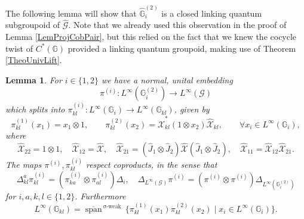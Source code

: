 \documentclass[reqno]{amsart}
\numberwithin{equation}{section}
\newtheorem{Lem}[Theorem]{Lemma}
\newcommand{\G}{\mathbb{G}}
\newcommand{\msG}{\mathscr{G}}
\newcommand{\mcX}{\mathcal{X}}
\newcommand{\wh}{\widehat}
\begin{document}
The following lemma will show that $\hat{\G}_{i}^{(2)}$ is a closed linking quantum subgroupoid of $\hat{\msG}$. Note that we already used this observation in the proof of Lemma \ref{LemProjCobPair}, but this relied on the fact that we knew the cocycle twist of $C^*(\G)$  provided a linking quantum groupoid, making use of Theorem \ref{TheoUnivLift}. 



\begin{Lem}\label{LemmaInclusionSubgroups}
For $i\in\{1,2\}$ we have a normal, unital embedding
\[
\pi^{(i)}\colon L^{\infty}(\G_i^{(2)}) \rightarrow L^{\infty}(\msG)
\]
which splits into $\pi^{(i)}_{kl}\colon L^{\infty}(\G_i) \rightarrow L^{\infty}(\G_{kl})$, given by 
\begin{equation}\label{EqInclusions}
\pi^{(1)}_{kl}(x_1) = x_1\otimes 1,\qquad \pi^{(2)}_{kl}(x_2) = \wh{\mcX}_{kl}^*(1\otimes x_2)\wh{\mcX}_{kl},\qquad \forall x_i \in L^{\infty}(\G_i),
\end{equation}
where 
\[
\wh{\mcX}_{22} = 1\otimes 1,\quad \wh{\mcX}_{12} = \wh{\mcX},\quad \wh{\mcX}_{21} = (\hat{J}_1\otimes \hat{J}_2)\wh{\mcX}(\hat{J}_1\otimes \hat{J}_2),\quad \wh{\mcX}_{11}= \wh{\mcX}_{12}\wh{\mcX}_{21}. 
\]
The maps $\pi^{(i)},\pi^{(i)}_{kl}$ respect coproducts, in the sense that
\[
\Delta^a_{kl}\pi^{(i)}_{kl}=
(\pi^{(i)}_{ka}\otimes \pi^{(i)}_{al})\Delta_i,\quad 
\Delta_{L^{\infty}(\msG)}\pi^{(i)}=
(\pi^{(i)}\otimes \pi^{(i)})\Delta_{L^{\infty}(\G_i^{(2)})}
\]
for $i,a,k,l\in\{1,2\}$. Furthermore
\[
L^{\infty}(\G_{kl}) = \overline{\operatorname{span}}^{\,\sigma\textrm{-weak}}\,\{\pi^{(1)}_{kl}(x_1)\pi^{(2)}_{kl}(x_2) \mid x_i \in L^{\infty}(\G_i)\}.
\]
\end{Lem} 
\end{document}
